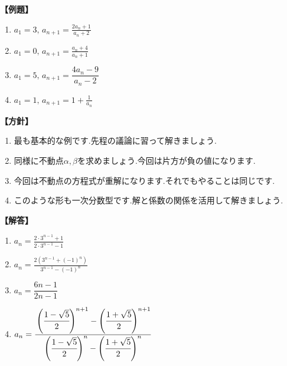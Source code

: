 \documentclass[dvipdfmx,a4paper,11pt,fleqn,openany]{jsbook}
\begin{document}
      \noindent \textbf{【例題】}
      \begin{enumerate}[label=(\arabic*),parsep=3pt]
        \item $\displaystyle a_1=3,\, a_{n+1}=\frac{2a_n+1}{a_n+2}$
        \item $\displaystyle a_1=0,\, a_{n+1}=\frac{a_n+4}{a_n+1}$
        \item $\displaystyle a_1=5,\, a_{n+1}=\dfrac{4a_{n}-9}{a_{n}-2}$
        \item $\displaystyle a_1=1,\, a_{n+1}=1+\frac{1}{a_n}$
      \end{enumerate}

      \noindent\textbf{【方針】}
      \begin{enumerate}[label=(\arabic*),parsep=3pt]
        \item 最も基本的な例です.先程の議論に習って解きましょう.
        \item 同様に不動点$\alpha,\beta$を求めましょう.今回は片方が負の値になります.
        \item 今回は不動点の方程式が重解になります.それでもやることは同じです.
        \item このような形も一次分数型です.解と係数の関係を活用して解きましょう.
      \end{enumerate}

      \noindent\textbf{【解答】}
      \begin{enumerate}[label=(\arabic*),parsep=3pt]
        \item $\displaystyle a_n=\frac{2\cdot3^{n-1}+1}{2\cdot3^{n-1}-1}$
        \item $\displaystyle a_n=\frac{2\left(3^{n-1}+(-1)^n\right)}{3^{n-1}-(-1)^n}$
        \item $a_{n}=\dfrac{6n-1}{2n-1}$
        \item $\displaystyle a_n=\cfrac{\left(\cfrac{1-\sqrt{5}}{2}\right)^{n+1}-\left(\cfrac{1+\sqrt{5}}{2}\right)^{n+1}}{\left(\cfrac{1-\sqrt{5}}{2}\right)^n-\left(\cfrac{1+\sqrt{5}}{2}\right)^n}$
      \end{enumerate}
\end{document}

